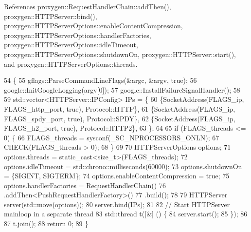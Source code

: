 References proxygen\+::\+Request\+Handler\+Chain\+::add\+Then(), proxygen\+::\+H\+T\+T\+P\+Server\+::bind(), proxygen\+::\+H\+T\+T\+P\+Server\+Options\+::enable\+Content\+Compression, proxygen\+::\+H\+T\+T\+P\+Server\+Options\+::handler\+Factories, proxygen\+::\+H\+T\+T\+P\+Server\+Options\+::idle\+Timeout, proxygen\+::\+H\+T\+T\+P\+Server\+Options\+::shutdown\+On, proxygen\+::\+H\+T\+T\+P\+Server\+::start(), and proxygen\+::\+H\+T\+T\+P\+Server\+Options\+::threads.


\begin{DoxyCode}
54                                  \{
55   gflags::ParseCommandLineFlags(&argc, &argv, \textcolor{keyword}{true});
56   google::InitGoogleLogging(argv[0]);
57   google::InstallFailureSignalHandler();
58 
59   std::vector<HTTPServer::IPConfig> IPs = \{
60     \{SocketAddress(FLAGS\_ip, FLAGS\_http\_port, \textcolor{keyword}{true}), Protocol::HTTP\},
61     \{SocketAddress(FLAGS\_ip, FLAGS\_spdy\_port, \textcolor{keyword}{true}), Protocol::SPDY\},
62     \{SocketAddress(FLAGS\_ip, FLAGS\_h2\_port, \textcolor{keyword}{true}), Protocol::HTTP2\},
63   \};
64 
65   \textcolor{keywordflow}{if} (FLAGS\_threads <= 0) \{
66     FLAGS\_threads = sysconf(\_SC\_NPROCESSORS\_ONLN);
67     CHECK(FLAGS\_threads > 0);
68   \}
69 
70   HTTPServerOptions options;
71   options.threads = \textcolor{keyword}{static\_cast<}\textcolor{keywordtype}{size\_t}\textcolor{keyword}{>}(FLAGS\_threads);
72   options.idleTimeout = std::chrono::milliseconds(60000);
73   options.shutdownOn = \{SIGINT, SIGTERM\};
74   options.enableContentCompression = \textcolor{keyword}{true};
75   options.handlerFactories = RequestHandlerChain()
76       .addThen<PushRequestHandlerFactory>()
77       .build();
78 
79   HTTPServer server(std::move(options));
80   server.bind(IPs);
81 
82   \textcolor{comment}{// Start HTTPServer mainloop in a separate thread}
83   std::thread t([&] () \{
84     server.start();
85   \});
86 
87   t.join();
88   \textcolor{keywordflow}{return} 0;
89 \}
\end{DoxyCode}
